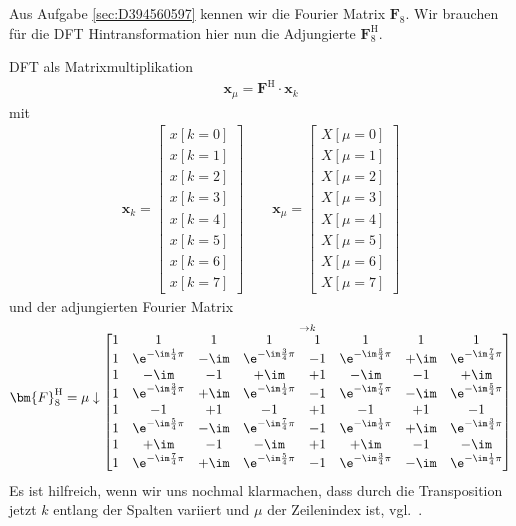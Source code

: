 \begin{Werkzeug}
Aus Aufgabe \ref{sec:D394560597} kennen wir die Fourier Matrix $\bm{F}_8$.
Wir brauchen für die DFT Hintransformation hier nun die Adjungierte $\bm{F}^\mathrm{H}_8$.
\end{Werkzeug}
\begin{Ansatz}
DFT als Matrixmultiplikation
\begin{align}
\bm{x}_\mu = \bm{F}^\mathrm{H} \cdot \bm{x}_k
\end{align}
mit
\begin{align}
%
\bm{x}_k =
\begin{bmatrix}
x[k=0]\\x[k=1]\\x[k=2]\\x[k=3]\\x[k=4]\\x[k=5]\\x[k=6]\\x[k=7]
\end{bmatrix}
%
\qquad
%
\bm{x}_\mu =
\begin{bmatrix}
X[\mu=0]\\X[\mu=1]\\X[\mu=2]\\X[\mu=3]\\X[\mu=4]\\X[\mu=5]\\X[\mu=6]\\X[\mu=7]
\end{bmatrix}
%
\end{align}
und der adjungierten Fourier Matrix
\begin{align}
\bm{F}^\mathrm{H}_8 =
\mu \downarrow
\substack{\rightarrow k\\
\begin{bmatrix}
1 & 1 & 1 & 1 & 1 & 1 & 1 & 1\\
1 & \e^{-\im\frac{1}{4}\pi} & -\im & \e^{-\im\frac{3}{4}\pi} & -1 & \e^{-\im\frac{5}{4}\pi} & +\im & \e^{-\im\frac{7}{4}\pi}\\
1 & -\im & -1 & +\im & +1 & -\im & -1 & +\im\\
1 & \e^{-\im\frac{3}{4}\pi} & +\im & \e^{-\im\frac{1}{4}\pi} & -1 & \e^{-\im\frac{7}{4}\pi} & -\im & \e^{-\im\frac{5}{4}\pi}\\
1 & -1 & +1 & -1 & +1 & -1 & +1 & -1\\
1 & \e^{-\im\frac{5}{4}\pi} & -\im & \e^{-\im\frac{7}{4}\pi} & -1 & \e^{-\im\frac{1}{4}\pi} & +\im & \e^{-\im\frac{3}{4}\pi}\\
1 & +\im & -1 & -\im & +1 & +\im & -1 & -\im\\
1 & \e^{-\im\frac{7}{4}\pi} & +\im & \e^{-\im\frac{5}{4}\pi} & -1 & \e^{-\im\frac{3}{4}\pi} & -\im & \e^{-\im\frac{1}{4}\pi}\\
\end{bmatrix}
}
%
\end{align}
Es ist hilfreich, wenn wir uns nochmal klarmachen, dass durch die Transposition
jetzt $k$ entlang der Spalten variiert und $\mu$ der Zeilenindex ist,
vgl.~.
\end{Ansatz}
%

